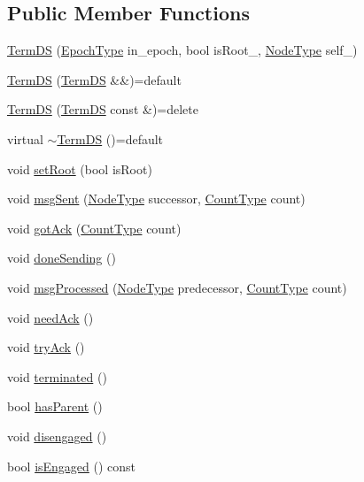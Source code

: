 \subsection*{Public Member Functions}
\begin{DoxyCompactItemize}
\item 
\hyperlink{structvt_1_1term_1_1ds_1_1_term_d_s_a1873de7f6d3009bd997c64eefb46d9b5}{Term\+DS} (\hyperlink{namespacevt_a81d11b28122d43bf9834577e4a06440f}{Epoch\+Type} in\+\_\+epoch, bool is\+Root\+\_\+, \hyperlink{namespacevt_a866da9d0efc19c0a1ce79e9e492f47e2}{Node\+Type} self\+\_\+)
\item 
\hyperlink{structvt_1_1term_1_1ds_1_1_term_d_s_a01ffd2a7fc4410599708c3fcb5998743}{Term\+DS} (\hyperlink{structvt_1_1term_1_1ds_1_1_term_d_s}{Term\+DS} \&\&)=default
\item 
\hyperlink{structvt_1_1term_1_1ds_1_1_term_d_s_a513d27464e9c231a24a755bf80a93dcd}{Term\+DS} (\hyperlink{structvt_1_1term_1_1ds_1_1_term_d_s}{Term\+DS} const \&)=delete
\item 
virtual \hyperlink{structvt_1_1term_1_1ds_1_1_term_d_s_ab7990eff9ce88551b3e2133f1664593a}{$\sim$\+Term\+DS} ()=default
\item 
void \hyperlink{structvt_1_1term_1_1ds_1_1_term_d_s_a684dd240eeab7ef4c2d1477840276f28}{set\+Root} (bool is\+Root)
\item 
void \hyperlink{structvt_1_1term_1_1ds_1_1_term_d_s_af03262950f250a7ebceb7079d3113a58}{msg\+Sent} (\hyperlink{namespacevt_a866da9d0efc19c0a1ce79e9e492f47e2}{Node\+Type} successor, \hyperlink{structvt_1_1term_1_1ds_1_1_term_d_s_a54f4ebd7e1ecb59c32c0f5b03ef9f20b}{Count\+Type} count)
\item 
void \hyperlink{structvt_1_1term_1_1ds_1_1_term_d_s_a6fcd87a189c046c48c341f39f9ea0b69}{got\+Ack} (\hyperlink{structvt_1_1term_1_1ds_1_1_term_d_s_a54f4ebd7e1ecb59c32c0f5b03ef9f20b}{Count\+Type} count)
\item 
void \hyperlink{structvt_1_1term_1_1ds_1_1_term_d_s_a9723c6b5db4318277329570e0974e1c7}{done\+Sending} ()
\item 
void \hyperlink{structvt_1_1term_1_1ds_1_1_term_d_s_a16ad493d9d01db734c20ea9a55b0ffc5}{msg\+Processed} (\hyperlink{namespacevt_a866da9d0efc19c0a1ce79e9e492f47e2}{Node\+Type} predecessor, \hyperlink{structvt_1_1term_1_1ds_1_1_term_d_s_a54f4ebd7e1ecb59c32c0f5b03ef9f20b}{Count\+Type} count)
\item 
void \hyperlink{structvt_1_1term_1_1ds_1_1_term_d_s_a134c10ef8be4d5e9e7e834e14ebb0ab1}{need\+Ack} ()
\item 
void \hyperlink{structvt_1_1term_1_1ds_1_1_term_d_s_ad5693df663610dc8003d37c5c505b9f4}{try\+Ack} ()
\item 
void \hyperlink{structvt_1_1term_1_1ds_1_1_term_d_s_acf4896eceb679d2ee46f5cc0ff1420e3}{terminated} ()
\item 
bool \hyperlink{structvt_1_1term_1_1ds_1_1_term_d_s_a5d112306bb319f8d5f542a104ccb87a6}{has\+Parent} ()
\item 
void \hyperlink{structvt_1_1term_1_1ds_1_1_term_d_s_a7f77705496eed386505e5bd266fc9800}{disengaged} ()
\item 
bool \hyperlink{structvt_1_1term_1_1ds_1_1_term_d_s_a5587da947484c81472ff0a4563a2efb4}{is\+Engaged} () const
\end{DoxyCompactItemize}
